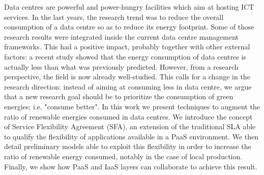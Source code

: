 
Data centres are powerful and power-hungry facilities which aim at hosting ICT services.
In the last years, the research trend was to reduce the overall consumption of a data centre so as to reduce its energy footprint.
Some of those research results were integrated inside the current data centre management frameworks.
This had a positive impact, probably together with other external factors: a recent study showed that the energy consumption of data centres is actually less than what was previously predicted.
However, from a research perspective, the field is now already well-studied.
This calls for a change in the research direction: instead of aiming at consuming less in data centre, we argue that a new research goal should be to prioritize the consumption of green energies; i.e. "consume better".
In this work we present techniques to augment the ratio of renewable energies consumed in data centres.
We introduce the concept of Service Flexibility Agreement (SFA), an extension of the traditional SLA able to qualify the flexibility of applications available in a PaaS environment.
We then detail preliminary models able to exploit this flexibility in order to increase the ratio of renewable energy consumed, notably in the case of local production.
Finally, we show how PaaS and IaaS layers can collaborate to achieve this result.
